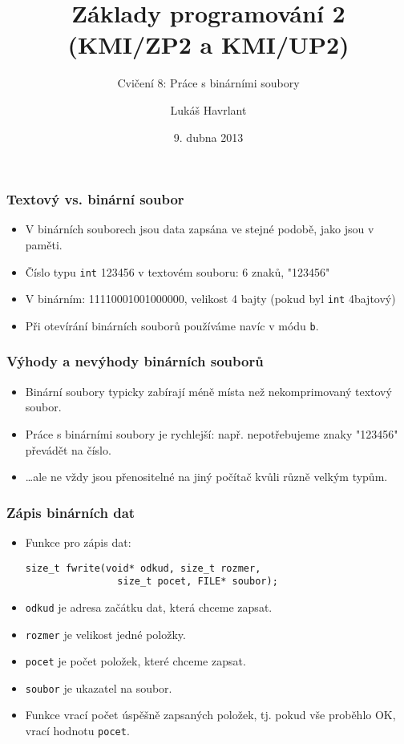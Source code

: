 \documentclass{beamer}
\title{Základy programování 2 (KMI/ZP2 a KMI/UP2)}
\subtitle{Cvičení 8: Práce s binárními soubory}
\author{Lukáš Havrlant}
\date{9. dubna 2013}
\institute{Univerzita Palackého}
\newenvironment{itemizex}%
  {\large \begin{itemize}%
    \setlength{\itemsep}{8pt}%
    \setlength{\parskip}{8pt}}%
  {\end{itemize}}
\newenvironment{itemizey}%
  {\large \begin{itemize}%
    \setlength{\itemsep}{6pt}%
    \setlength{\parskip}{6pt}}%
  {\end{itemize}}
\begin{document}
\begin{frame}[t,plain]
\titlepage
\end{frame}


\begin{frame}[t,fragile]\frametitle{Textový vs. binární soubor} 
    \begin{itemizex}
        \item V binárních souborech jsou data zapsána ve stejné podobě, jako jsou v paměti.
        \item Číslo typu \texttt{int} 123456 v textovém souboru: 6 znaků, "123456"
        \item V binárním: 11110001001000000, velikost 4 bajty (pokud byl \texttt{int} 4bajtový)
        \item Při otevírání binárních souborů používáme navíc v módu \texttt{b}.
    \end{itemizex}
\end{frame}


\begin{frame}[t,fragile]\frametitle{Výhody a nevýhody binárních souborů} 
    \begin{itemizex}
        \item Binární soubory typicky zabírají méně místa než nekomprimovaný textový soubor.
        \item Práce s binárními soubory je rychlejší: např. nepotřebujeme znaky "123456" převádět na číslo.
        \item \dots ale ne vždy jsou přenositelné na jiný počítač kvůli různě velkým typům.
    \end{itemizex}
\end{frame}


\begin{frame}[t,fragile]\frametitle{Zápis binárních dat} 
    \begin{itemizey}
        \item Funkce pro zápis dat:
\begin{verbatim} 
size_t fwrite(void* odkud, size_t rozmer, 
                size_t pocet, FILE* soubor);
\end{verbatim}
        \item \texttt{odkud} je adresa začátku dat, která chceme zapsat. 
        \item \texttt{rozmer} je velikost jedné položky.
        \item \texttt{pocet} je počet položek, které chceme zapsat.
        \item \texttt{soubor} je ukazatel na soubor.
        \item Funkce vrací počet úspěšně zapsaných položek, tj. pokud vše proběhlo OK, vrací hodnotu \texttt{pocet}.
    \end{itemizey}
\end{frame}
\end{document}
